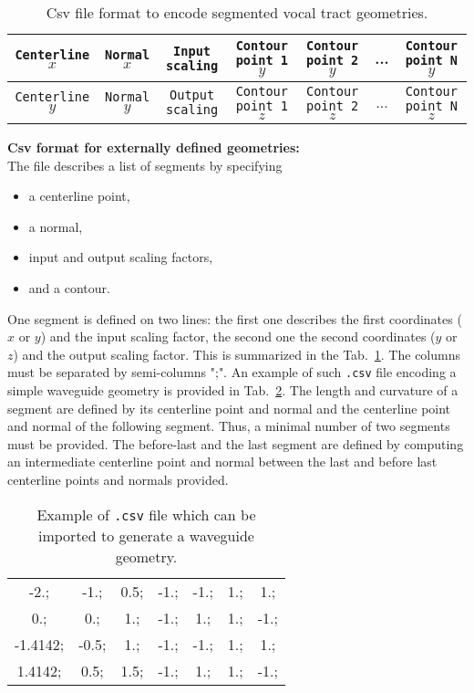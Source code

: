 \documentclass[]{article}
\begin{document}
\begin{table}
	\centering
	\begin{tabular}{c c c c c c c}
		\hline
		\texttt{Centerline} $x$ & \texttt{Normal} $x$ & 
		\texttt{Input scaling} & \texttt{Contour point 1} $y$ &  
		\texttt{Contour point 2} $y$ & ... 
		& \texttt{Contour point N} $y$ \\
		\hline
		\texttt{Centerline} $y$ & \texttt{Normal} $y$ & 
		\texttt{Output scaling} & \texttt{Contour point 1} $z$ &  
		\texttt{Contour point 2} $z$ & ... 
		& \texttt{Contour point N} $z$ \\
		\hline
	\end{tabular}
\caption{Csv file format to encode segmented vocal tract geometries.}
\label{table:csv_file_format}
\end{table}
	
	\textbf{Csv format for externally defined geometries:}\\
	The file describes a list of segments by specifying
	\begin{itemize}
		\item a centerline point,
		\item a normal,
		\item input and output scaling factors,
		\item and a contour.
	\end{itemize}
	One segment is defined on two lines: the first one describes the 
	first coordinates ($x$ or $y$) and the input scaling factor, the second one the second coordinates ($y$ or $z$) and the output scaling factor. 
	This is summarized in the Tab.~\ref{table:csv_file_format}.
	The columns must be separated by semi-columns ";". 
	An example of such \texttt{.csv} file encoding a simple waveguide
	geometry is provided in Tab.~\ref{table:example_csv_file}.
	The length and curvature of a segment are defined by its centerline
	point and normal and the centerline point and normal of the 
	following segment.
	Thus, a minimal number of two segments must be provided. 
	The before-last and the last segment are defined by computing an 
	intermediate centerline point and normal between the last and 
	before last centerline points and normals provided.
	
	\begin{table}
		\centering
		\begin{tabular}{c c c c c c c }
			-2.;& -1.;& 0.5;& -1.;& -1.;& 1.;& 1.; \\
			0.;& 0.;& 1.;& -1.;& 1.;& 1.;& -1.; \\
			-1.4142;& -0.5;& 1.;& -1.;& -1.;& 1.;& 1.; \\
			1.4142;& 0.5;& 1.5;& -1.;& 1.;& 1.;& -1.; 
		\end{tabular}
		\caption{Example of \texttt{.csv} file which can be imported to generate a waveguide geometry.}
		\label{table:example_csv_file}
	\end{table}
\end{document}
